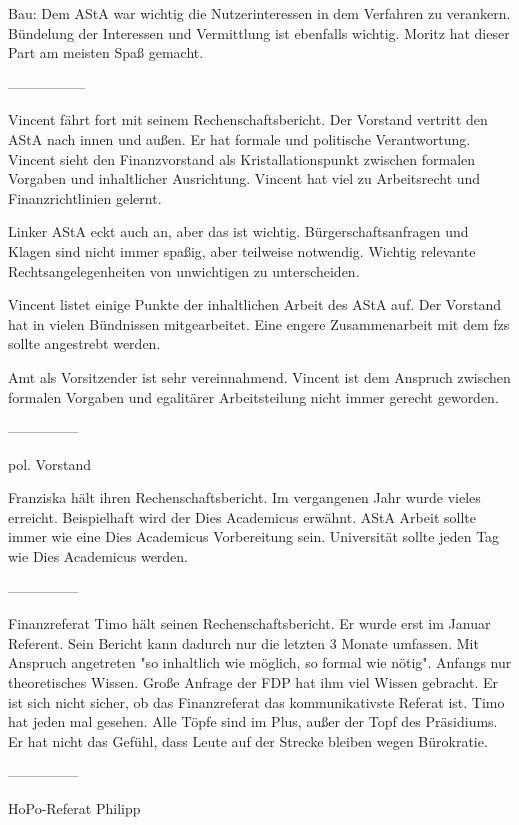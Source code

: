 \documentclass[ngerman,headheight=70pt]{scrartcl}
\begin{document}
    Bau:
    Dem AStA war wichtig die Nutzerinteressen in dem Verfahren zu verankern.
    Bündelung der Interessen und Vermittlung ist ebenfalls wichtig.
    Moritz hat dieser Part am meisten Spaß gemacht.

    -----------------

    Vincent fährt fort mit seinem Rechenschaftsbericht.
    Der Vorstand vertritt den AStA nach innen und außen. Er hat formale und
    politische Verantwortung. Vincent sieht den Finanzvorstand als Kristallationspunkt
    zwischen formalen Vorgaben und inhaltlicher Ausrichtung. Vincent hat viel
    zu Arbeitsrecht und Finanzrichtlinien gelernt.

    Linker AStA eckt auch an, aber das ist wichtig. Bürgerschaftsanfragen und Klagen sind
    nicht immer spaßig, aber teilweise notwendig. Wichtig relevante Rechtsangelegenheiten
    von unwichtigen zu unterscheiden.

    Vincent listet einige Punkte der inhaltlichen Arbeit des AStA auf. Der Vorstand
    hat in vielen Bündnissen mitgearbeitet. Eine engere Zusammenarbeit mit dem fzs
    sollte angestrebt werden.

    Amt als Vorsitzender ist sehr vereinnahmend. Vincent ist dem Anspruch
    zwischen formalen Vorgaben und egalitärer Arbeitsteilung nicht immer
    gerecht geworden.

    ---------------

    pol. Vorstand

    Franziska hält ihren Rechenschaftsbericht. Im vergangenen Jahr wurde vieles
    erreicht. Beispielhaft wird der Dies Academicus erwähnt. AStA Arbeit sollte
    immer wie eine Dies Academicus Vorbereitung sein. Universität sollte jeden
    Tag wie Dies Academicus werden.

    ---------------

    Finanzreferat
    Timo hält seinen Rechenschaftsbericht. Er wurde erst im Januar Referent.
    Sein Bericht kann dadurch nur die letzten 3 Monate umfassen. Mit Anspruch
    angetreten "so inhaltlich wie möglich, so formal wie nötig". Anfangs nur
    theoretisches Wissen. Große Anfrage der FDP hat ihm viel Wissen gebracht.
    Er ist sich nicht sicher, ob das Finanzreferat das kommunikativste Referat
    ist. Timo hat jeden mal gesehen. Alle Töpfe sind im Plus, außer der Topf
    des Präsidiums. Er hat nicht das Gefühl, dass Leute auf der Strecke bleiben
    wegen Bürokratie.

    ---------------

    HoPo-Referat
    Philipp
\end{document}
